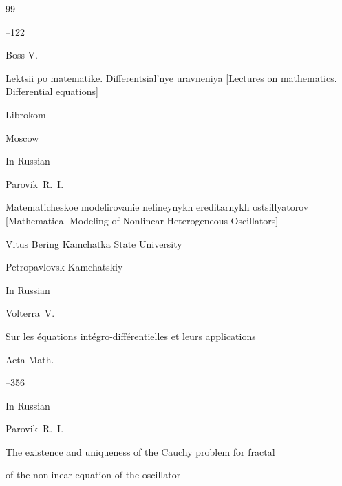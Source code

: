 \begin{thebibliography}{99}



--122





\by Boss V.

\book Lektsii po matematike. Differentsial'nye uravneniya \rm [Lectures on mathematics. Differential equations]


\publ Librokom

\publaddr Moscow

\lang In Russian





\by Parovik~R.~I. 

\book Matematicheskoe modelirovanie nelineynykh ereditarnykh ostsillyatorov \rm [Mathematical Modeling of Nonlinear Heterogeneous Oscillators]


\publ Vitus Bering Kamchatka State University

\publaddr Petropavlovsk-Kamchatskiy

\lang In Russian





\by Volterra~V. 

\paper Sur les \'equations int\'egro-diff\'erentielles et leurs applications

\jour Acta Math.




--356







\lang In Russian

\by Parovik~R.~I.

\paper The existence and uniqueness of the Cauchy problem for fractal

of the nonlinear equation of the oscillator


\end{thebibliography}
